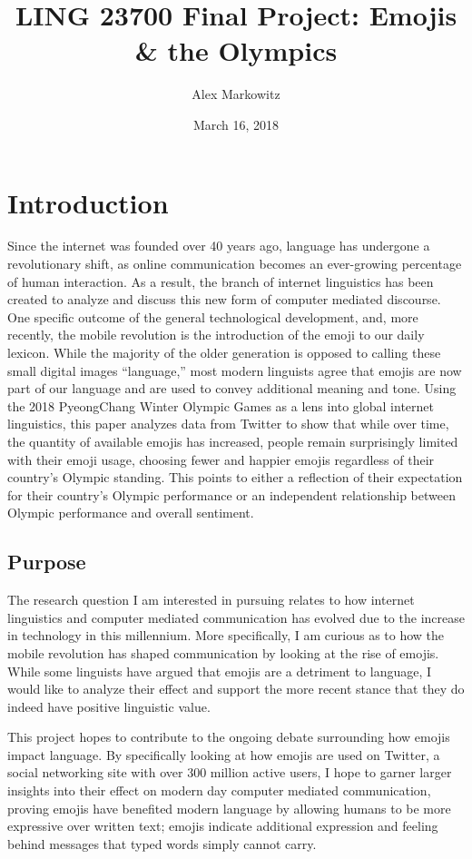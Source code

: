 \documentclass[a4paper,12pt]{article}
\title{LING 23700 Final Project: Emojis \& the Olympics}
\author{Alex Markowitz}
\date{March 16, 2018}
\begin{document}
\maketitle
\tableofcontents
\pagebreak

\section{Introduction}
Since the internet was founded over 40 years ago, language has undergone a revolutionary shift, as online communication becomes an ever-growing percentage of human interaction. As a result, the branch of internet linguistics has been created to analyze and discuss this new form of computer mediated discourse. One specific outcome of the general technological development, and, more recently, the mobile revolution is the introduction of the emoji to our daily lexicon. While the majority of the older generation is opposed to calling these small digital images “language,” most modern linguists agree that emojis are now part of our language and are used to convey additional meaning and tone. Using the 2018 PyeongChang Winter Olympic Games as a lens into global internet linguistics, this paper analyzes data from Twitter to show that while over time, the quantity of available emojis has increased, people remain surprisingly limited with their emoji usage, choosing fewer and happier emojis regardless of their country’s Olympic standing. This points to either a reflection of their expectation for their country’s Olympic performance or an independent relationship between Olympic performance and overall sentiment. 

\subsection{Purpose}
The research question I am interested in pursuing relates to how internet linguistics and computer mediated communication has evolved due to the increase in technology in this millennium. More specifically, I am curious as to how the mobile revolution has shaped communication by looking at the rise of emojis. While some linguists have argued that emojis are a detriment to language, I would like to analyze their effect and support the more recent stance that they do indeed have positive linguistic value.

This project hopes to contribute to the ongoing debate surrounding how emojis impact language. By specifically looking at how emojis are used on Twitter, a social networking site with over 300 million active users, I hope to garner larger insights into their effect on modern day computer mediated communication, proving emojis have benefited modern language by allowing humans to be more expressive over written text; emojis indicate additional expression and feeling behind messages that typed words simply cannot carry. 
\end{document}
